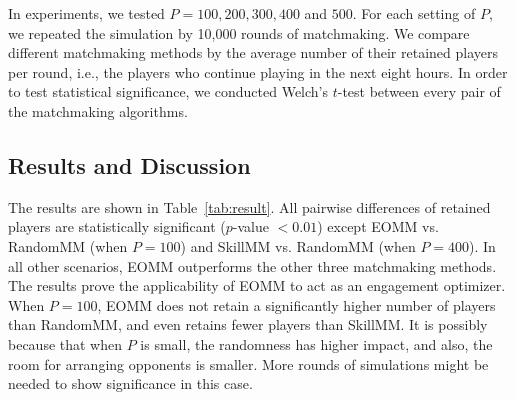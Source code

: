 In experiments, we tested $P=100, 200, 300, 400$ and $500$. For each setting of $P$, we repeated the simulation by 10,000 rounds of matchmaking. We compare different matchmaking methods by the average number of their retained players per round, i.e., the players who continue playing in the next eight hours. In order to test statistical significance, we conducted Welch's $t$-test between every pair of the matchmaking algorithms.







\subsection{Results and Discussion}

The results are shown in Table~\ref{tab:result}. All pairwise differences of retained players are statistically significant ($p$-value $< 0.01$) except EOMM vs.\! RandomMM (when $P=100$) and SkillMM vs.\! RandomMM (when $P=400$). In all other scenarios, EOMM outperforms the other three matchmaking methods. The results prove the applicability of EOMM to act as an engagement optimizer. When $P=100$, EOMM does not retain a significantly higher number of players than RandomMM, and even retains fewer players than SkillMM. It is possibly because that when $P$ is small, the randomness has higher impact, and also, the room for arranging opponents is smaller. More rounds of simulations might be needed to show significance in this case.

